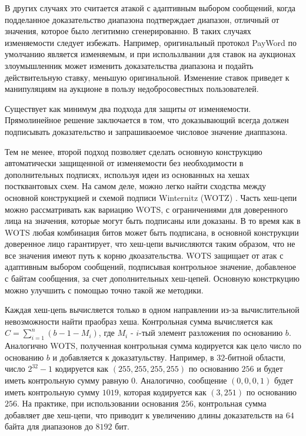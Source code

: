 В других случаях это считается атакой с адаптивным выбором сообщений, когда подделанное доказательство диапазона подтверждает диапазон, отличный от значения, которое было легитимно сгенерированно.
В таких случаях изменяемости следует избежать.
Например, оригинальный протокол PayWord по умолчанию является изменяемым, и при использлвании для ставок на аукционах злоумышленник может изменить доказательства диапазона и подайть действительную ставку, меньшую оригинальной.
Изменение ставок приведет к манипуляциям на аукционе в пользу недобросовестных пользователей.

Существует как минимум два подхода для защиты от изменяемости.
Прямолинейное решение заключается в том, что доказывающий всегда должен подписывать доказательство и запрашиваоемое числовое значение диаппазона.

Тем не менее, второй подход позволяет сделать основную конструкцию автоматически защищенной от изменяемости без необходимости в дополнительных подписях, используя идеи из основанных на хешах постквантовых схем.
На самом деле, можно легко найти сходства между основной конструкцией и схемой подписи Winternitz (WOTZ) \cite{cryptoeprint:2011/191, 10.1007/0-387-34805-0_21}.
Часть хеш-цепи можно рассматривать как вариацию WOTS, с ограничениями для доверенного лица на значения, которые могут быть подписаны или доказаны.
В то время как в WOTS любая комбинация битов может быть подписана, в основной конструкции доверенное лицо гарантирует, что хеш-цепи вычисляются таким образом, что не все значения имеют путь к корню дкоазательства.
WOTS защищает от атак с адаптивным выбором сообщений, подписывая контрольное значение, добавленое с байтам сообщения, за счет дополнительных хеш-цепей.
Основную констркуцию можно улучшить с помощью точно такой же методики.

Каждая хеш-цепь вычисляется только в одном направлении из-за вычислительной невозможности найти праобраз хеша. Контрольная сумма вычисляется как $C = \sum^n_{i = 1} (b - 1 - M_i)$, где $M_i$ - $i$-тый элемент разложения по основанию $b$.
Аналогично WOTS, полученная контрольная сумма кодируется как цело число по основанию $b$ и добавляется к доказатульству.
Например, в $32$-битной области, число $2^{32} - 1$ кодируется как $(255, 255, 255, 255)$ по основанию $256$ и будет иметь контрольную сумму равную $0$. Аналогично, сообщение $(0, 0, 0, 1)$ будет иметь контрольную сумму $1019$, которая кодируется как $(3, 251)$ по основанию $256$.
На практике, при использовании основания $256$, контрольная сумма добавляет две хеш-цепи, что приводит к увеличению длины доказательств на $64$ байта для диапазонов до $8192$ бит.

